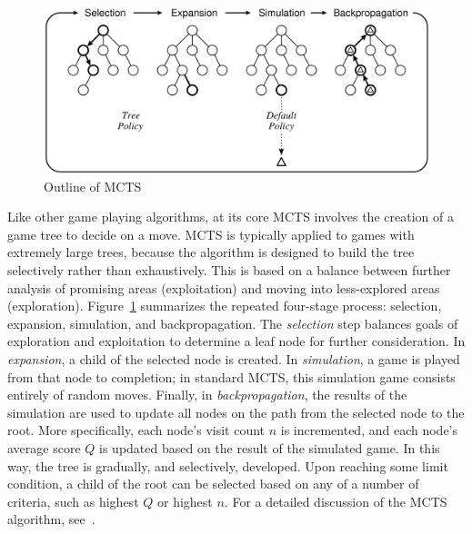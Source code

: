 \documentclass[letterpaper]{article}
\begin{document}
\begin{figure}[b]
\begin{center}
\includegraphics[width=.95\linewidth]{images/oneiteration.png}
\end{center}
\caption{Outline of MCTS~\cite{browne2012survey} }
\label{fig:OneIter}
\end{figure}


Like other game playing algorithms, at its core MCTS involves the creation of a game tree to decide on a move. MCTS is typically applied to games with extremely large trees, because the algorithm is designed to build the tree selectively rather than exhaustively. This is based on a balance between further analysis of promising areas (exploitation) and moving into less-explored areas (exploration). Figure~\ref{fig:OneIter} summarizes the repeated four-stage process: selection, expansion, simulation, and backpropagation. The {\it selection} step balances goals of exploration and exploitation to determine a leaf node for further consideration. In {\it expansion}, a child of the selected node is created. In {\it simulation}, a game is played from that node to completion; in standard MCTS, this simulation game consists entirely of random moves. Finally, in {\it backpropagation}, the results of the simulation are used to update all nodes on the path from the selected node to the root. More specifically, each node's visit count $n$ is incremented, and each node's average score $Q$ is updated based on the result of the simulated game. In this way, the tree is gradually, and selectively, developed. Upon reaching some limit condition, a child of the root can be selected based on any of a number of criteria, such as highest $Q$ or highest $n$. For a detailed discussion of the MCTS algorithm, see~\cite{browne2012survey}.
\end{document}
